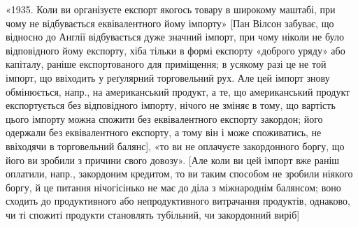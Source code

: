 «1935. Коли ви організуєте експорт якогось товару в широкому маштабі,
при чому не відбувається еквівалентного йому імпорту» [Пан Вілсон забуває,
що відносно до Англії відбувається дуже значний імпорт, при чому ніколи не
було відповідного йому експорту, хіба тільки в формі експорту «доброго уряду»
або капіталу, раніше експортованого для приміщення; в усякому разі це не той
імпорт, що ввіходить у реґулярний торговельний рух. Але цей імпорт знову
обмінюється, напр., на американський продукт, а те, що американський
продукт експортується без відповідного імпорту, нічого не зміняє в тому, що
вартість цього імпорту можна спожити без еквівалентного експорту закордон;
його одержали без еквівалентного експорту, а тому він і може споживатись, не
ввіходячи в торговельний балянс], «то ви не оплачуєте закордонного боргу, що
його ви зробили з причини свого довозу». [Але коли ви цей імпорт вже
раніш оплатили, напр., закордоним кредитом, то ви таким способом не зробили
ніякого боргу, й це питання нічогісінько не має до діла з міжнароднім балянсом;
воно сходить до продуктивного або непродуктивного витрачання продуктів,
однаково, чи ті спожиті продукти становлять тубільний, чи закордонний виріб]
\parbreak{}  %
